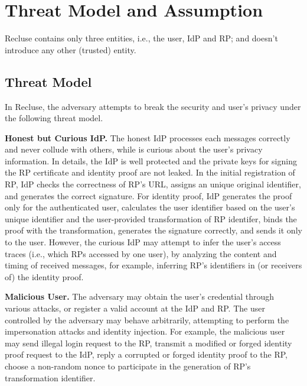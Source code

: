 \section{Threat Model and Assumption}
\label{sec:assumptionandthreatmodel}
Recluse contains only three entities, i.e., the user, IdP and RP; and doesn't introduce any other (trusted) entity.


\subsection{Threat Model}
In Recluse, the adversary attempts to break the security and user's privacy under the following threat model.

\textbf{Honest but Curious IdP.}
The honest IdP processes each messages correctly and never collude with others, while is curious about the user's privacy information.
In details, the IdP is well protected and the private keys for signing the RP certificate and identity proof are not leaked.
In the initial registration of RP,  IdP checks the correctness of RP's URL,  assigns an unique original identifier, and generates the correct signature.
For identity proof, IdP generates the proof only for the authenticated user, calculates the user identifier based on the user's unique identifier
and the user-provided transformation of RP identifer, binds the proof with the transformation, generates the signature correctly,
and sends it only to the user.
However, the curious IdP may attempt to infer the user's access traces (i.e., which RPs accessed by one user),
by analyzing the content and timing of received messages, for example, inferring RP's identifiers in (or receivers of) the identity proof.

\textbf{Malicious User.} %
The adversary may obtain the user's credential through various attacks, or register a valid account at the IdP and RP.
The user controlled by the adversary may behave arbitrarily, attempting to perform the impersonation attacks and identity injection.
For example, the malicious user  may send illegal login request to the RP,
transmit a modified or forged identity proof request to the IdP,
reply a corrupted or forged identity proof to the RP,
 choose a non-random nonce to participate in the generation of RP's transformation identifier.


